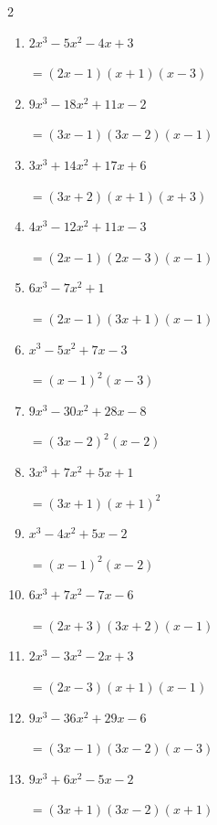 \begin{multicols}{2}
\begin{enumerate}
  \item $2x^{3}-5x^{2}-4x+3$

        $=(2x-1)(x+1)(x-3)$

  \item $9x^{3}-18x^{2}+11x-2$

        $=(3x-1)(3x-2)(x-1)$

  \item $3x^{3}+14x^{2}+17x+6$

        $=(3x+2)(x+1)(x+3)$

\columnbreak %

\resetques

  \item $4x^{3}-12x^{2}+11x-3$

        $=(2x-1)(2x-3)(x-1)$

  \item $6x^{3}-7x^{2}+1$

        $=(2x-1)(3x+1)(x-1)$

  \item $x^{3}-5x^{2}+7x-3$

        $=(x-1) ^{ 2 }(x-3)$

  \item $9x^{3}-30x^{2}+28x-8$

        $=(3x-2) ^{ 2 }(x-2)$

  \item $3x^{3}+7x^{2}+5x+1$

        $=(3x+1)(x+1) ^{ 2 }$

\columnbreak %

  \item $x^{3}-4x^{2}+5x-2$

        $=(x-1) ^{ 2 }(x-2)$

  \item $6x^{3}+7x^{2}-7x-6$

        $=(2x+3)(3x+2)(x-1)$

  \item $2x^{3}-3x^{2}-2x+3$

        $=(2x-3)(x+1)(x-1)$

  \item $9x^{3}-36x^{2}+29x-6$

        $=(3x-1)(3x-2)(x-3)$

  \item $9x^{3}+6x^{2}-5x-2$

        $=(3x+1)(3x-2)(x+1)$

\columnbreak %

\resetques


\end{enumerate}
\end{multicols}
